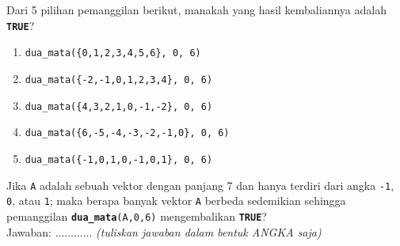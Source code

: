 \documentclass[a4paper]{article}
\begin{document}
\begin{enumerate}
\noindent Dari 5 pilihan pemanggilan berikut, manakah yang hasil kembaliannya adalah \texttt{\textbf{TRUE}}?

\begin{enumerate}[label=\Alph*.]
    \item \texttt{dua\_mata(\{0,1,2,3,4,5,6\}, 0, 6)}
    \item \texttt{dua\_mata(\{-2,-1,0,1,2,3,4\}, 0, 6)}
    \item \texttt{dua\_mata(\{4,3,2,1,0,-1,-2\}, 0, 6)}
    \item \texttt{dua\_mata(\{6,-5,-4,-3,-2,-1,0\}, 0, 6)}
    \item \texttt{dua\_mata(\{-1,0,1,0,-1,0,1\}, 0, 6)}
\end{enumerate}

\noindent Jika \texttt{A} adalah sebuah vektor dengan panjang 7 dan hanya terdiri dari angka \texttt{-1}, \texttt{0}, atau \texttt{1}; maka berapa banyak vektor \texttt{A} berbeda sedemikian sehingga pemanggilan \texttt{\textbf{dua\_mata}(A,0,6)} mengembalikan \textbf{\texttt{TRUE}}?\\
Jawaban: ............ \textit{(tuliskan jawaban dalam bentuk ANGKA saja)}

\end{enumerate}
\end{document}
